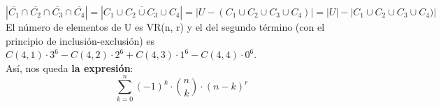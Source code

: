 \documentclass{article}
\begin{document}
$$|\overline{C_1} \cap \overline{C_2} \cap \overline{C_3} \cap \overline{C_4}| = |\overline{C_1 \cup C_2 \cup C_3 \cup C_4}| = |U - (C_1 \cup C_2 \cup C_3 \cup C_4)| = |U| - |C_1 \cup C_2 \cup C_3 \cup C_4)|$$
El número de elementos de U es VR(n, r) y el del segundo término (con el principio de inclusión-exclusión) es $C(4, 1) \cdot 3^6 - C(4, 2) \cdot 2^6 + C(4, 3) \cdot 1^6 - C(4, 4) \cdot 0^6$. \\
Así, nos queda \textbf{la expresión}:
$$\sum_{k=0}^n (-1)^k \cdot \binom{n}{k} \cdot (n-k)^r$$

\end{document}
